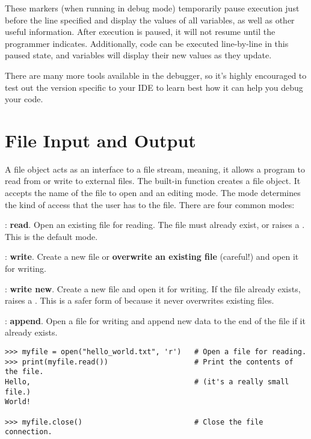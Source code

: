 These markers (when running in debug mode) temporarily pause execution just before the line specified and display the values of all variables, as well as other useful information.
After execution is paused, it will not resume until the programmer indicates.
Additionally, code can be executed line-by-line in this paused state, and variables will display their new values as they update.

There are many more tools available in the debugger, so it's highly encouraged to test out the version specific to your IDE to learn best how it can help you debug your code.


\section*{File Input and Output} %

A file object acts as an interface to a file stream, meaning, it allows a program to read from or write to external files.
The built-in function  creates a file object.
It accepts the name of the file to open and an editing mode.
The mode determines the kind of access that the user has to the file.
There are four common modes:
%
\begin{description}
\item {}: \textbf{read}.
Open an existing file for reading.
The file must already exist, or  raises a .
This is the default mode.
\item {}: \textbf{write}.
Create a new file or \textbf{overwrite an existing file} (careful!) and open it for writing.
\item {}: \textbf{write new}.
Create a new file and open it for writing.
If the file already exists,  raises a .
This is a safer form of  because it never overwrites existing files.
\item {}: \textbf{append}.
Open a file for writing and append new data to the end of the file if it already exists.
\end{description}

\begin{lstlisting}
>>> myfile = open("hello_world.txt", 'r')   # Open a file for reading.
>>> print(myfile.read())                    # Print the contents of the file.
Hello,                                      # (it's a really small file.)
World!

>>> myfile.close()                          # Close the file connection.
\end{lstlisting}


